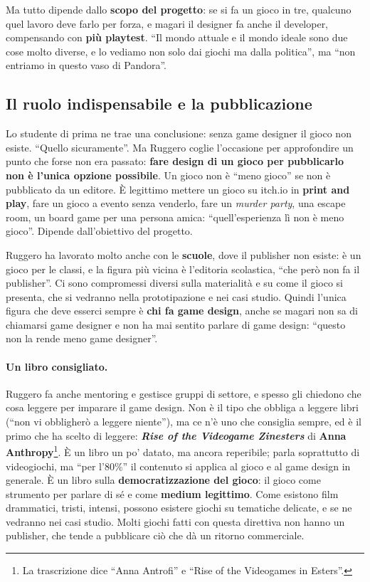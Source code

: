 Ma tutto dipende dallo \textbf{scopo del progetto}: se si fa un gioco in tre,
qualcuno quel lavoro deve farlo per forza, e magari il designer fa anche il
developer, compensando con \textbf{più playtest}. ``Il mondo attuale e il mondo
ideale sono due cose molto diverse, e lo vediamo non solo dai giochi ma dalla
politica'', ma ``non entriamo in questo vaso di Pandora''.

\subsection{Il ruolo indispensabile e la pubblicazione}

Lo studente di prima ne trae una conclusione: senza game designer il gioco non
esiste. ``Quello sicuramente''. Ma Ruggero coglie l'occasione per approfondire
un punto che forse non era passato: \textbf{fare design di un gioco per
pubblicarlo non è l'unica opzione possibile}. Un gioco non è ``meno gioco''
se non è pubblicato da un editore. È legittimo mettere un gioco su itch.io in
\textbf{print and play}, fare un gioco a evento senza venderlo, fare un
\emph{murder party}, una escape room, un board game per una persona amica:
``quell'esperienza lì non è meno gioco''. Dipende dall'obiettivo del progetto.

Ruggero ha lavorato molto anche con le \textbf{scuole}, dove il publisher non
esiste: è un gioco per le classi, e la figura più vicina è l'editoria scolastica,
``che però non fa il publisher''. Ci sono compromessi diversi sulla materialità
e su come il gioco si presenta, che si vedranno nella prototipazione e nei casi
studio. Quindi l'unica figura che deve esserci sempre è \textbf{chi fa game
design}, anche se magari non sa di chiamarsi game designer e non ha mai
sentito parlare di game design: ``questo non la rende meno game designer''.

\paragraph{Un libro consigliato.} Ruggero fa anche mentoring e gestisce gruppi
di settore, e spesso gli chiedono che cosa leggere per imparare il game design.
Non è il tipo che obbliga a leggere libri (``non vi obbligherò a leggere
niente''), ma ce n'è uno che consiglia sempre, ed è il primo che ha scelto di
leggere: \textbf{\emph{Rise of the Videogame Zinesters}} di \textbf{Anna
Anthropy}\footnote{La trascrizione dice ``Anna Antrofi'' e ``Rise of the
Videogames in Esters''.}. È un libro un po' datato, ma ancora reperibile; parla
soprattutto di videogiochi, ma ``per l'80\%'' il contenuto si applica al gioco e
al game design in generale. È un libro sulla \textbf{democratizzazione del gioco}:
il gioco come strumento per parlare di sé e come \textbf{medium legittimo}. Come
esistono film drammatici, tristi, intensi, possono esistere giochi su tematiche
delicate, e se ne vedranno nei casi studio. Molti giochi fatti con questa
direttiva non hanno un publisher, che tende a pubblicare ciò che dà un ritorno
commerciale.

